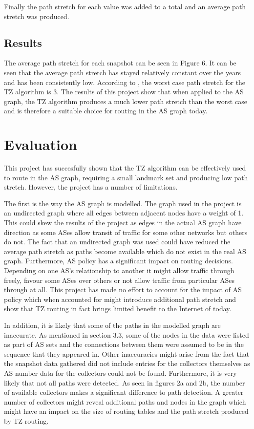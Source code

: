 \documentclass{mpaper}
\begin{document}
Finally the path stretch for each value was added to a total and an average path stretch was produced.
\subsection{Results}

The average path stretch for each snapshot can be seen in Figure 6. It can be seen that the average path stretch has stayed relatively constant over the years and has been consistently low. According to \cite{thorup}, the worst case path stretch for the TZ algorithm is 3. The results of this project show that when applied to the AS graph, the TZ algorithm produces a much lower path stretch than the worst case and is therefore a suitable choice for routing in the AS graph today. 


\section{Evaluation}
This project has succesfully shown that the TZ algorithm can be effectively used to route in the AS graph, requiring a small landmark set and producing low path stretch. However, the project has a number of limitations.

The first is the way the AS graph is modelled. The graph used in the project is an undirected graph where all edges between adjacent nodes have a weight of 1. This could skew the results of the project as edges in the actual AS graph have direction as some ASes allow transit of traffic for some other networks but others do not. The fact that an undirected graph was used could have reduced the average path stretch as paths become available which do not exist in the real AS graph. Furthermore, AS policy has a significant impact on routing decisions. Depending on one AS's relationship to another it might allow traffic through freely, favour some ASes over others or not allow traffic from particular ASes through at all. This project has made no effort to account for the impact of AS policy which when accounted for might introduce additional path stretch and show that TZ routing in fact brings limited benefit to the Internet of today. 

In addition, it is likely that some of the paths in the modelled graph are inaccurate. As mentioned in section 3.3, some of the nodes in the data were listed as part of AS sets and the connections between them were assumed to be in the sequence that they appeared in. Other inaccuracies might arise from the fact that the snapshot data gathered did not include entries for the collectors themselves as AS number data for the collectors could not be found. Furthermore, it is very likely that not all paths were detected. As seen in figures 2a and 2b, the number of available collectors makes a significant difference to path detection. A greater number of collectors might reveal additional paths and nodes in the graph which might have an impact on the size of routing tables and the path stretch produced by TZ routing. 
\end{document}

